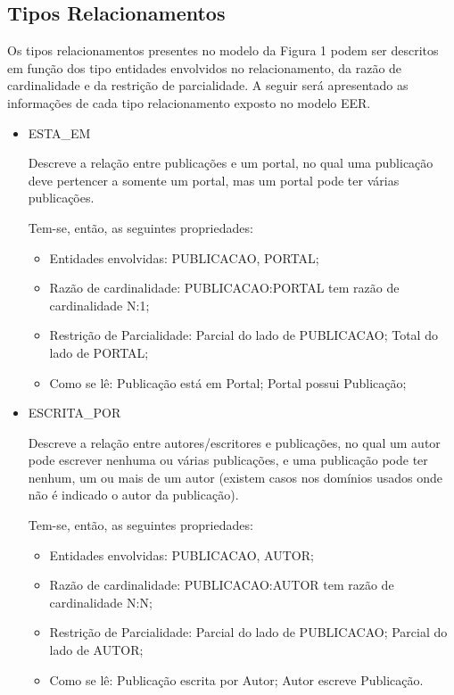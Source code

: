 \subsection{Tipos Relacionamentos}

Os tipos relacionamentos presentes no modelo da Figura 1 podem ser descritos em função dos tipo entidades envolvidos no relacionamento, da razão de cardinalidade e da restrição de parcialidade. A seguir será apresentado as informações de cada tipo relacionamento exposto no modelo EER.

\begin{itemize}
				
\item ESTA\_EM

Descreve a relação entre publicações e um portal, no qual uma publicação deve pertencer a somente um portal, mas um portal pode ter várias publicações.

Tem-se, então, as seguintes propriedades:

\begin{itemize}

\item Entidades envolvidas: PUBLICACAO, PORTAL;
\item Razão de cardinalidade: PUBLICACAO:PORTAL tem razão de cardinalidade N:1;
\item Restrição de Parcialidade: Parcial do lado de PUBLICACAO; Total do lado de PORTAL;
\item Como se lê: Publicação está em Portal; Portal possui Publicação;
\end{itemize}
\end{itemize}

\begin{itemize}

				\item ESCRITA\_POR

Descreve a relação entre autores/escritores e publicações, no qual um autor pode escrever nenhuma ou várias publicações, e uma publicação pode ter nenhum, um ou mais de um autor (existem casos nos domínios usados onde não é indicado o autor da publicação).

Tem-se, então, as seguintes propriedades:

\begin{itemize}

				\item Entidades envolvidas: PUBLICACAO, AUTOR;
				\item Razão de cardinalidade: PUBLICACAO:AUTOR tem razão de cardinalidade N:N;
				\item Restrição de Parcialidade: Parcial do lado de PUBLICACAO; Parcial do lado de AUTOR;
				\item Como se lê: Publicação escrita por Autor; Autor escreve Publicação.
\end{itemize}
\end{itemize}

